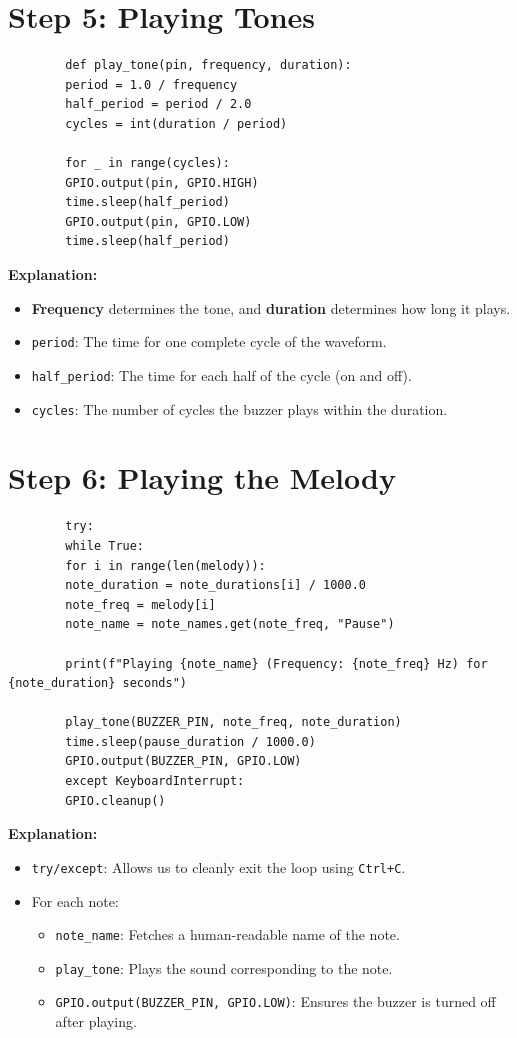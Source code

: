 \documentclass{article}
\begin{document}
	\section*{Step 5: Playing Tones}
	\begin{lstlisting}
		def play_tone(pin, frequency, duration):
		period = 1.0 / frequency
		half_period = period / 2.0
		cycles = int(duration / period)
		
		for _ in range(cycles):
		GPIO.output(pin, GPIO.HIGH)
		time.sleep(half_period)
		GPIO.output(pin, GPIO.LOW)
		time.sleep(half_period)
	\end{lstlisting}
	
	\textbf{Explanation:}
	\begin{itemize}
		\item \textbf{Frequency} determines the tone, and \textbf{duration} determines how long it plays.
		\item \texttt{period}: The time for one complete cycle of the waveform.
		\item \texttt{half\_period}: The time for each half of the cycle (on and off).
		\item \texttt{cycles}: The number of cycles the buzzer plays within the duration.
	\end{itemize}
	
	\section*{Step 6: Playing the Melody}
	\begin{lstlisting}
		try:
		while True:
		for i in range(len(melody)):
		note_duration = note_durations[i] / 1000.0
		note_freq = melody[i]
		note_name = note_names.get(note_freq, "Pause")
		
		print(f"Playing {note_name} (Frequency: {note_freq} Hz) for {note_duration} seconds")
		
		play_tone(BUZZER_PIN, note_freq, note_duration)
		time.sleep(pause_duration / 1000.0)
		GPIO.output(BUZZER_PIN, GPIO.LOW)
		except KeyboardInterrupt:
		GPIO.cleanup()
	\end{lstlisting}
	
	\textbf{Explanation:}
	\begin{itemize}
		\item \texttt{try/except}: Allows us to cleanly exit the loop using \texttt{Ctrl+C}.
		\item For each note:
		\begin{itemize}
			\item \texttt{note\_name}: Fetches a human-readable name of the note.
			\item \texttt{play\_tone}: Plays the sound corresponding to the note.
			\item \texttt{GPIO.output(BUZZER\_PIN, GPIO.LOW)}: Ensures the buzzer is turned off after playing.
		\end{itemize}
	\end{itemize}
	
\end{document}
